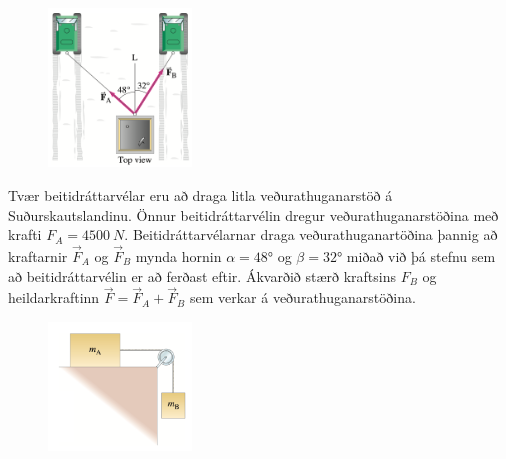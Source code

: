 \begin{enumerate}[label = \textbf{Dæmi \thechapter.\arabic*.}]
\begin{minipage}{\linewidth}
\end{minipage}

\vspace{0.4cm}

\begin{minipage}{\linewidth}
\begin{figure}
\vspace{-0.5cm}
\includegraphics[width=1.5in]{images/snowcat.png}
\end{figure}

\item Tvær beitidráttarvélar eru að draga litla veðurathuganarstöð á Suðurskautslandinu. Önnur beitidráttarvélin dregur veðurathuganarstöðina með krafti $F_A = \SI{4500}{N}$. Beitidráttarvélarnar draga veðurathuganartöðina þannig að kraftarnir $\vec{F}_A$ og $\vec{F}_B$ mynda hornin $\alpha = \ang{48}$ og $\beta = \ang{32}$ miðað við þá stefnu sem að beitidráttarvélin er að ferðast eftir. Ákvarðið stærð kraftsins $F_B$ og heildarkraftinn $\vec{F} = \vec{F}_A + \vec{F}_B$ sem verkar á veðurathuganarstöðina.
\end{minipage}

\vspace{0.5cm}

\begin{minipage}{\linewidth}
\begin{figure}
\vspace{0.5cm}
\includegraphics[width=1.5in]{images/trissbert.png}
\end{figure}


\end{minipage}
\end{enumerate}

